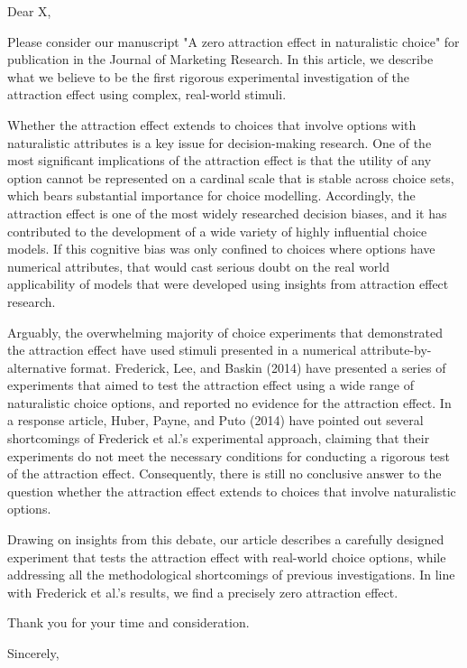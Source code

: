 \documentclass{letter}
\begin{document}
\begin{letter}
{}
\opening{Dear X,}


Please consider our manuscript "A zero attraction effect in naturalistic choice" for publication in the Journal of Marketing Research. In this article, we describe what we believe to be the first rigorous experimental investigation of the attraction effect using complex, real-world stimuli. 

Whether the attraction effect extends to choices that involve options with naturalistic attributes is a key issue for decision-making research. One of the most significant implications of the attraction effect is that the utility of any option cannot be represented on a cardinal scale that is stable across choice sets, which bears substantial importance for choice modelling. Accordingly, the attraction effect is one of the most widely researched decision biases, and it has contributed to the development of a wide variety of highly influential choice models. If this cognitive bias was only confined to choices where options have numerical attributes, that would cast serious doubt on the real world applicability of models that were developed using insights from attraction effect research.

Arguably, the overwhelming majority of choice experiments that demonstrated the attraction effect have used stimuli presented in a numerical attribute-by-alternative format. Frederick, Lee, and Baskin (2014) have presented a series of experiments that aimed to test the attraction effect using a wide range of naturalistic choice options, and reported no evidence for the attraction effect. In a response article, Huber, Payne, and Puto (2014) have pointed out several shortcomings of Frederick et al.'s experimental approach, claiming that their experiments do not meet the necessary conditions for conducting a rigorous test of the attraction effect. Consequently, there is still no conclusive answer to the question whether the attraction effect extends to choices that involve naturalistic options.

Drawing on insights from this debate, our article describes a carefully designed experiment that tests the attraction effect with real-world choice options, while addressing all the methodological shortcomings of previous investigations. In line with Frederick et al.'s results, we find a precisely zero attraction effect.


Thank you for your time and consideration.


\closing{Sincerely,}



\end{letter}
\end{document}
